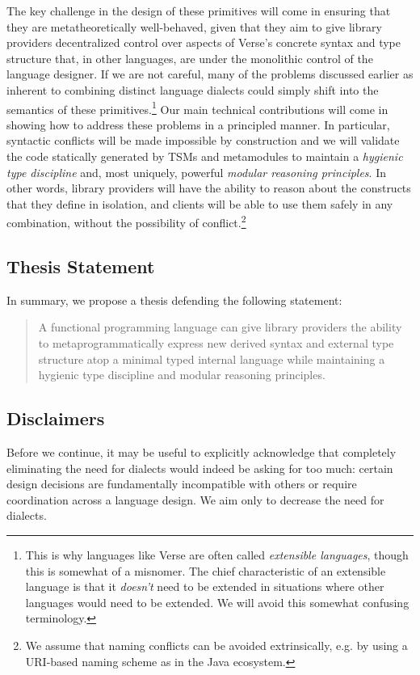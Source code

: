 The key challenge in the design of these primitives will come in ensuring that they are metatheoretically well-behaved, given that they aim to give library providers decentralized control over aspects of Verse's concrete syntax and type structure that, in other languages, are under the monolithic control of the language designer. If we are not careful, many of the problems discussed earlier as inherent to combining distinct language dialects could simply shift into the semantics of these primitives.\footnote{This is why languages  like Verse are often called \emph{extensible languages}, though this is somewhat of a misnomer. The chief characteristic of an extensible language is that it \emph{doesn't} need to be extended in situations where other languages would need to be extended. We will avoid this somewhat confusing terminology.} Our main technical contributions will come in showing how to address these problems in a principled manner. In particular, syntactic conflicts will be made impossible by construction and  we will validate the code  statically generated by TSMs and metamodules to maintain a \emph{hygienic type discipline} and, most uniquely, powerful \emph{modular reasoning principles}. In other words, library providers will have the ability to reason about the constructs that they define in isolation, and clients will be able to use them safely in any combination, without the possibility of conflict.\footnote{We  assume that naming conflicts can be avoided extrinsically, e.g. by using a URI-based naming scheme as in the Java ecosystem.}




\subsection{Thesis Statement}
In summary, we propose a thesis defending the following statement:
\begin{quote}
A functional programming language can give library providers the ability to meta\-pro\-gram\-matic\-ally express new derived syntax and external type structure atop a minimal typed internal language while maintaining a hygienic type discipline and modular reasoning principles. %
\end{quote}

\subsection{Disclaimers}
Before we continue, it may be useful to explicitly acknowledge that completely eliminating the need for dialects would indeed be asking for too much: certain design decisions are fundamentally incompatible with others or require coordination across a language design. We aim only to decrease the need for dialects.%

